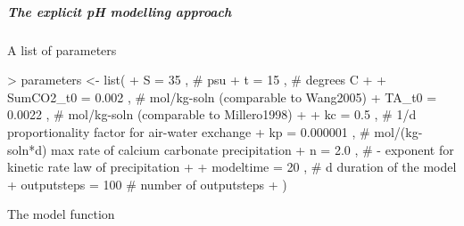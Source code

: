 \documentclass[article,nojss]{jss}
\begin{document}
\subparagraph{The explicit pH modelling approach}$\,$\\


A list of parameters       
\begin{scriptsize}
\begin{Schunk}
\begin{Sinput}
> parameters <- list(             
+     S           = 35        , # psu       
+     t           = 15        , # degrees C
+ 
+     SumCO2_t0   = 0.002     , # mol/kg-soln  (comparable to Wang2005)
+     TA_t0       = 0.0022    , # mol/kg-soln  (comparable to Millero1998)
+ 
+     kc          = 0.5       , # 1/d	         proportionality factor for air-water exchange
+     kp          = 0.000001  , # mol/(kg-soln*d)	 max rate of calcium carbonate precipitation
+     n           = 2.0       , # -                 exponent for kinetic rate law of precipitation
+                                       
+     modeltime   = 20        , # d              duration of the model
+     outputsteps = 100         #                number of outputsteps
+                    )
\end{Sinput}
\end{Schunk}
\end{scriptsize}

The model function
\begin{scriptsize}
\begin{Schunk}
\end{Schunk}
\end{scriptsize}
\end{document}
